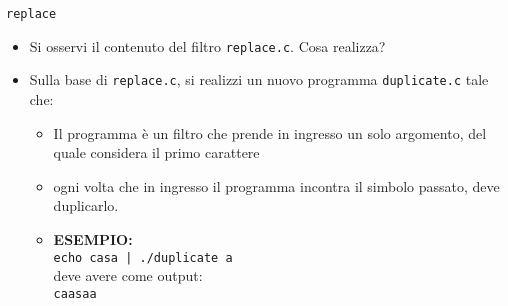 \documentclass{beamer}
\begin{document}
\begin{frame}[fragile]{\texttt{replace}}
\begin{itemize}
 \item Si osservi il contenuto del filtro \texttt{replace.c}. Cosa realizza?
 \item Sulla base di \texttt{replace.c}, si realizzi un nuovo programma \texttt{duplicate.c} tale che:
 \begin{itemize}
  \item Il programma è un filtro che prende in ingresso un solo argomento, del quale considera il primo carattere
  \item ogni volta che in ingresso il programma incontra il simbolo passato, deve duplicarlo.
  \item \textbf{ESEMPIO:} \\ \texttt{echo casa | ./duplicate a} \\ deve avere come output: \\ \texttt{caasaa}
 \end{itemize}
\end{itemize}
\end{frame}
\end{document}
